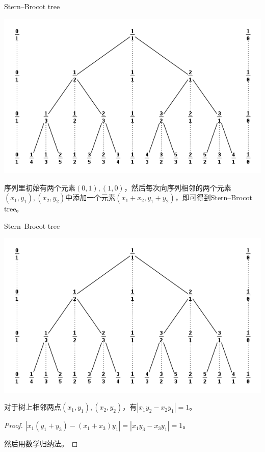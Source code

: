 \documentclass{ctexbeamer}        %
\begin{document}
\begin{frame}{Stern–Brocot tree}

\begin{definition}
	\includegraphics[scale=0.3]{figure2.png}

    序列里初始有两个元素$(0,1),(1,0)$，然后每次向序列相邻的两个元素$(x_1,y_1),(x_2,y_2)$中添加一个元素$(x_1+x_2,y_1+y_2)$，即可得到Stern–Brocot tree。
\end{definition}
\end{frame}

\begin{frame}{Stern–Brocot tree}

\begin{theorem}
	\includegraphics[scale=0.3]{figure2.png}

    对于树上相邻两点$(x_1,y_1),(x_2,y_2)$，有$|x_1y_2-x_2y_1|=1$。
\end{theorem}
\begin{proof}
    $|x_1(y_1+y_3)-(x_1+x_3)y_1|=|x_1y_3-x_3y_1|=1$。
    
    然后用数学归纳法。
\end{proof}
\end{frame}
\end{document}
